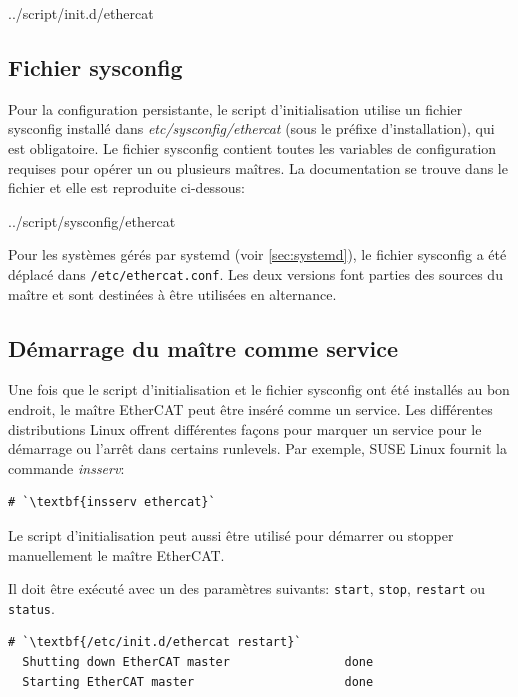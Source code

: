 \documentclass[a4paper,12pt,BCOR=6mm,bibtotoc,idxtotoc]{scrbook}
\begin{document}

    {../script/init.d/ethercat}

\subsection{Fichier sysconfig}
\label{sec:sysconfig}

Pour la configuration persistante, le script d'initialisation utilise
un fichier sysconfig install\'e dans \textit{etc/sysconfig/ethercat}
(sous le pr\'efixe d'installation), qui est obligatoire.  Le fichier
sysconfig contient toutes les variables de configuration requises pour
op\'erer un ou plusieurs ma\^itres. La documentation se trouve dans le
fichier et elle est reproduite ci-dessous:


    {../script/sysconfig/ethercat}

    Pour les syst\`emes g\'er\'es par systemd (voir \autoref{sec:systemd}),
    le fichier sysconfig a \'et\'e d\'eplac\'e dans \lstinline+/etc/ethercat.conf+.
    Les deux versions font parties des sources du ma\^itre et sont destin\'ees
    \`a \^etre utilis\'ees en alternance.

\subsection{D\'emarrage du ma\^itre comme service}
\label{sec:service}

Une fois que le script d'initialisation et le fichier sysconfig ont
\'et\'e install\'es au bon endroit, le ma\^itre EtherCAT peut \^etre
ins\'er\'e comme un service.  Les diff\'erentes distributions Linux
offrent diff\'erentes fa\c{c}ons pour marquer un service pour le
d\'emarrage ou l'arr\^et dans certains runlevels. Par exemple, SUSE
Linux fournit la commande \textit{insserv}:

\begin{lstlisting}
# `\textbf{insserv ethercat}`
\end{lstlisting}

Le script d'initialisation peut aussi \^etre utilis\'e pour d\'emarrer
ou stopper manuellement le ma\^itre EtherCAT.

Il doit \^etre ex\'ecut\'e avec un des param\`etres suivants:
\texttt{start}, \texttt{stop}, \texttt{restart} ou \texttt{status}.

\begin{lstlisting}[gobble=2]
  # `\textbf{/etc/init.d/ethercat restart}`
  Shutting down EtherCAT master                done
  Starting EtherCAT master                     done
\end{lstlisting}
\end{document}
